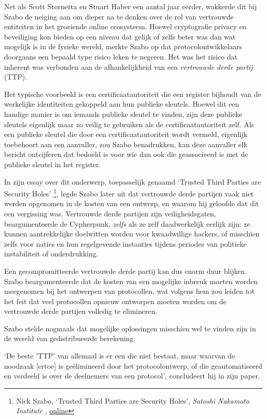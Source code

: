 \documentclass[smalldemyvopaper,11pt,twoside,onecolumn,openright,extrafontsizes,hidelinks]{memoir}
\begin{document}
Net als Scott Stornetta en Stuart Haber een aantal jaar eerder, wakkerde
dit bij Szabo de neiging aan om dieper na te denken over de rol van
vertrouwde entiteiten in het groeiende online ecosysteem. Hoewel
cryptografie privacy en beveiliging kon bieden op een niveau dat gelijk
of zelfs beter was dan wat mogelijk is in de fysieke wereld, merkte
Szabo op dat protocolontwikkelaars doorgaans een bepaald type risico
leken te negeren. Het was het risico dat inherent was verbonden aan de
afhankelijkheid van een \emph{vertrouwde derde partij} (TTP).

Het typische voorbeeld is een certificaatautoriteit die een register
bijhoudt van de werkelijke identiteiten gekoppeld aan hun publieke
sleutels. Hoewel dit een handige manier is om iemands publieke sleutel
te vinden, zijn deze publieke sleutels eigenlijk maar zo veilig te
gebruiken als de certificaatautoriteit zelf. Als een publieke sleutel
die door een certificaatautoriteit wordt vermeld, eigenlijk toebehoort
aan een aanvaller, zou Szabo benadrukken, kan deze aanvaller elk bericht
ontcijferen dat bedoeld is voor wie dan ook die geassocieerd is met de
publieke sleutel in het register.

In zijn essay over dit onderwerp, toepasselijk genaamd `Trusted Third
Parties are Security Holes' \footnote{Nick Szabo, `Trusted Third Parties
  are Security Holes', \emph{Satoshi Nakamoto Institute} ,
  \href{https://nakamotoinstitute.org/library/trusted-third-parties/}{online}},
legde Szabo later uit dat vertrouwde derde partijen vaak niet werden
opgenomen in de kosten van een ontwerp, en waarom hij geloofde dat dit
een vergissing was. Vertrouwde derde partijen zijn veiligheidsgaten,
beargumenteerde de Cypherpunk, \emph{zelfs} als ze zelf daadwerkelijk
eerlijk zijn: ze kunnen aantrekkelijke doelwitten worden voor
kwaadwillige hackers, of misschien zelfs voor naties en hun regelgevende
instanties tijdens periodes van politieke instabiliteit of
onderdrukking.

Een gecompromitteerde vertrouwde derde partij kan dus enorm duur
blijken. Szabo beargumenteerde dat de kosten van een mogelijke inbreuk
moeten worden meegenomen bij het ontwerpen van protocollen, wat volgens
hem zou leiden tot het feit dat veel protocollen opnieuw ontworpen
moeten worden om de vertrouwde derde partijen volledig te elimineren.

Szabo stelde nogmaals dat mogelijke oplossingen misschien wel te vinden
zijn in de wereld van gedistribueerde berekening.

`De beste 'TTP' van allemaal is er een die niet bestaat, maar waarvan de
noodzaak {[}ertoe{]} is geëlimineerd door het protocolontwerp, of die
geautomatiseerd en verdeeld is over de deelnemers van een protocol',
concludeert hij in zijn paper.
\end{document}

